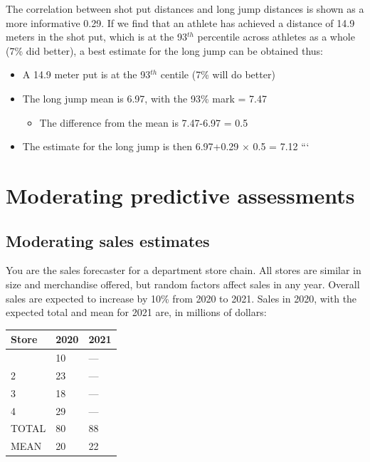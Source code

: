 \documentclass[
  10pt,
  b5paper]{book}
\providecommand{\tightlist}{%
  \setlength{\itemsep}{0pt}\setlength{\parskip}{0pt}}
\begin{document}
The correlation between shot put distances and long jump distances
is shown as a more informative 0.29. If we find that an athlete
has achieved a distance of 14.9 meters in the shot put, which is
at the 93\(^{th}\) percentile across athletes as a whole
(7\% did better), a best estimate for the long jump can be
obtained thus:

\begin{itemize}
\tightlist
\item
  A 14.9 meter put is at the 93\(^{th}\) centile (7\% will do better)
\item
  The long jump mean is 6.97, with the 93\% mark = 7.47

  \begin{itemize}
  \tightlist
  \item
    The difference from the mean is 7.47-6.97 = 0.5
  \end{itemize}
\item
  The estimate for the long jump is then 6.97+0.29 \(\times\) 0.5 = 7.12
  ```
\end{itemize}

\hypertarget{moderating-predictive-assessments}{%
\section{Moderating predictive assessments}\label{moderating-predictive-assessments}}

\hypertarget{moderating-sales-estimates}{%
\subsection*{Moderating sales estimates}\label{moderating-sales-estimates}}

You are the sales forecaster for a department store chain.
All stores are similar in size and merchandise offered,
but random factors affect sales in any year. Overall sales
are expected to increase by 10\% from 2020 to 2021. Sales
in 2020, with the expected total and mean for 2021 are,
in millions of dollars:

\begin{longtable}[]{@{}lll@{}}
\toprule\noalign{}
Store & 2020 & 2021 \\
\midrule\noalign{}
\endhead
\bottomrule\noalign{}
\endlastfoot
1 & 10 & --- \\
2 & 23 & --- \\
3 & 18 & --- \\
4 & 29 & --- \\
TOTAL & 80 & 88 \\
MEAN & 20 & 22 \\
\end{longtable}
\end{document}
